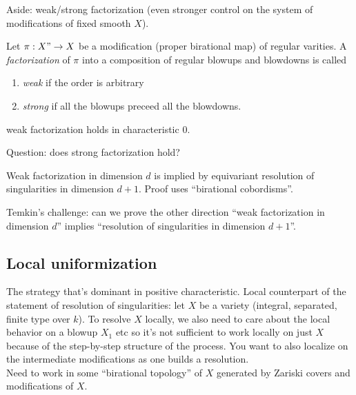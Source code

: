 \documentclass[12pt]{article}
\begin{document}
Aside: weak/strong factorization (even stronger control on the system of modifications of fixed smooth $X$). 

\begin{defn}
Let $\pi : X" \to X$ be a modification (proper birational map) of regular varities. A \textit{factorization} of $\pi$ into a composition of regular blowups and blowdowns is called
\begin{enumerate}
\item \textit{weak} if the order is arbitrary
\item \textit{strong} if all the blowups preceed all the blowdowns.
\end{enumerate}
\end{defn}

\begin{theorem}
weak factorization holds in characteristic $0$.
\end{theorem}

Question: does strong factorization hold? 

\begin{rmk}
Weak factorization in dimension $d$ is implied by equivariant resolution of singularities in dimension $d + 1$. Proof uses ``birational cobordisms''. 
\end{rmk}

Temkin's challenge: can we prove the other direction ``weak factorization in dimension $d$'' implies ``resolution of singularities in dimension $d+1$''. 

\subsection{Local uniformization}

\newcommand{\reg}{\mathrm{reg}}

The strategy that's dominant in positive characteristic. Local counterpart of the statement of resolution of singularities: let $X$ be a variety (integral, separated, finite type over $k$). To resolve $X$ locally, we also need to care about the local behavior on a blowup $X_1$ etc so it's not sufficient to work locally on just $X$ because of the step-by-step structure of the process. You want to also localize on the intermediate modifications as one builds a resolution. 
\\
Need to work in some ``birational topology'' of $X$ generated by Zariski covers and modifications of $X$. 
\end{document}

